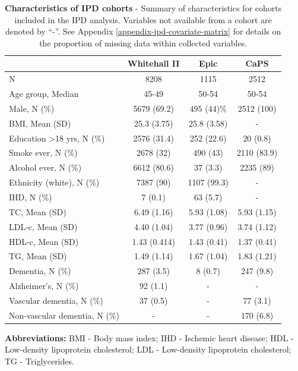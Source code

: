 \documentclass[a4paper, twoside]{templates/ociamthesis}
\begin{document}
\begin{table}[H]

\caption[Summary of characteristics of IPD cohorts]{\label{tab:covariateSummary-table}\textbf{Characteristics of IPD cohorts} - Summary of characteristics for cohorts included in the IPD analysis. Variables not available from a cohort are denoted by ``-''. See Appendix \ref{appendix-ipd-covariate-matrix} for details on the proportion of missing data within collected variables.}
\centering
\begin{threeparttable}
\begin{tabular}[t]{>{}lccc}
\toprule
\textbf{ } & \textbf{Whitehall II} & \textbf{Epic} & \textbf{CaPS}\\
\midrule
N & 8208 & 1115 & 2512\\
\midrule
Age group, Median & 45-49 & 50-54 & 50-54\\
\midrule
Male, N (\%) & 5679 (69.2) & 495 (44)\% & 2512 (100)\\
\midrule
BMI, Mean (SD) & 25.3 (3.75) & 25.8 (3.58) & -\\
\midrule
Education >18 yrs, N (\%) & 2576 (31.4) & 252 (22.6) & 20 (0.8)\\
\midrule
\addlinespace
Smoke ever, N (\%) & 2678 (32) & 490 (43) & 2110 (83.9)\\
\midrule
Alcohol ever, N (\%) & 6612 (80.6) & 37 (3.3) & 2235 (89)\\
\midrule
Ethnicity (white), N (\%) & 7387 (90) & 1107 (99.3) & -\\
\midrule
IHD, N (\%) & 7 (0.1) & 63 (5.7) & -\\
\midrule
TC, Mean (SD) & 6.49 (1.16) & 5.93 (1.08) & 5.93 (1.15)\\
\midrule
\addlinespace
LDL-c, Mean (SD) & 4.40 (1.04) & 3.77 (0.96) & 3.74 (1.12)\\
\midrule
HDL-c, Mean (SD) & 1.43 (0.414) & 1.43 (0.41) & 1.37 (0.41)\\
\midrule
TG, Mean (SD) & 1.49 (1.14) & 1.67 (1.04) & 1.83 (1.21)\\
\midrule
Dementia, N (\%) & 287 (3.5) & 8 (0.7) & 247 (9.8)\\
\midrule
Alzheimer's, N (\%) & 92 (1.1) & - & -\\
\midrule
\addlinespace
Vascular dementia, N (\%) & 37 (0.5) & - & 77 (3.1)\\
\midrule
Non-vascular dementia, N (\%) & - & - & 170 (6.8)\\
\bottomrule
\end{tabular}
\begin{tablenotes}
\item \textbf{Abbreviations:} BMI - Body mass index; IHD - Ischemic heart disease; HDL - Low-density lipoprotein cholesterol; LDL - Low-density lipoprotein cholesterol; TG - Triglycerides.
\end{tablenotes}
\end{threeparttable}
\end{table}
\end{document}
